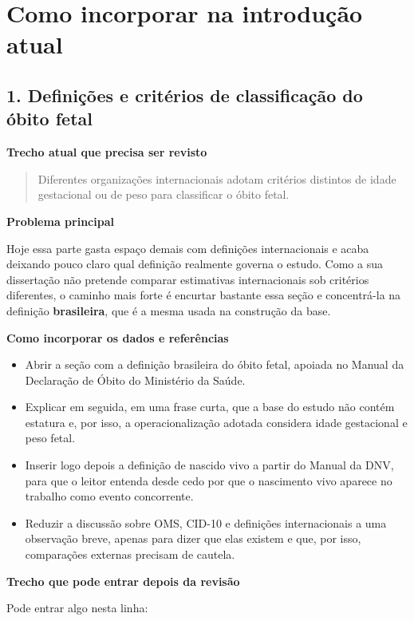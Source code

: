 \documentclass[12pt,a4paper]{article}
\begin{document}
\section*{Como incorporar na introdução atual}

\subsection*{1. Definições e critérios de classificação do óbito fetal}

\textbf{Trecho atual que precisa ser revisto}

\begin{quote}
Diferentes organizações internacionais adotam critérios distintos de idade gestacional ou de peso para classificar o óbito fetal.
\end{quote}

\textbf{Problema principal}

Hoje essa parte gasta espaço demais com definições internacionais e acaba deixando pouco claro qual definição realmente governa o estudo. Como a sua dissertação não pretende comparar estimativas internacionais sob critérios diferentes, o caminho mais forte é encurtar bastante essa seção e concentrá-la na definição \textbf{brasileira}, que é a mesma usada na construção da base.

\textbf{Como incorporar os dados e referências}

\begin{itemize}
\item Abrir a seção com a definição brasileira do óbito fetal, apoiada no Manual da Declaração de Óbito do Ministério da Saúde.
\item Explicar em seguida, em uma frase curta, que a base do estudo não contém estatura e, por isso, a operacionalização adotada considera idade gestacional e peso fetal.
\item Inserir logo depois a definição de nascido vivo a partir do Manual da DNV, para que o leitor entenda desde cedo por que o nascimento vivo aparece no trabalho como evento concorrente.
\item Reduzir a discussão sobre OMS, CID-10 e definições internacionais a uma observação breve, apenas para dizer que elas existem e que, por isso, comparações externas precisam de cautela.
\end{itemize}

\textbf{Trecho que pode entrar depois da revisão}

Pode entrar algo nesta linha:
\end{document}
